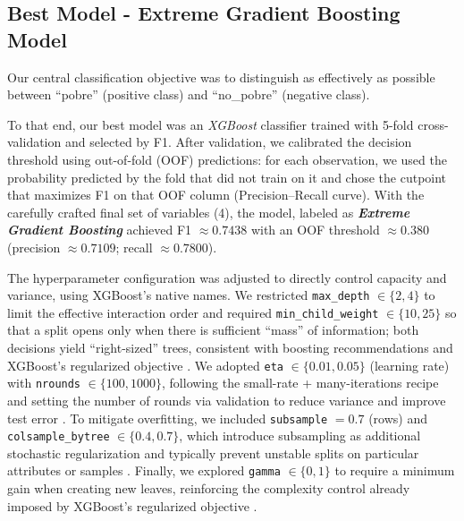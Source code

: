 \documentclass[12pt,a4paper,onecolumn]{article}
\begin{document}
\subsection{Best Model - Extreme Gradient Boosting Model}

Our central classification objective was to distinguish as effectively as possible between ``pobre'' (positive class) and ``no\_pobre'' (negative class).

To that end, our best model was an \textit{XGBoost} classifier trained with 5-fold cross-validation and selected by F1. After validation, we calibrated the decision threshold using out-of-fold (OOF) predictions: for each observation, we used the probability predicted by the fold that did not train on it and chose the cutpoint that maximizes F1 on that OOF column (Precision--Recall curve). With the carefully crafted
final set of variables (4), the model, labeled as \textbf{\textit{Extreme Gradient Boosting}} achieved F1 $\approx 0.7438$ with an OOF threshold $\approx 0.380$ (precision $\approx 0.7109$; recall $\approx 0.7800$). 

The hyperparameter configuration was adjusted to directly control capacity and variance, using XGBoost’s native names. We restricted \texttt{max\_depth} $\in \{2,4\}$ to limit the effective interaction order and required \texttt{min\_child\_weight} $\in \{10,25\}$ so that a split opens only when there is sufficient ``mass'' of information; both decisions yield ``right-sized'' trees, consistent with boosting recommendations and XGBoost’s regularized objective \citep{ChenGuestrin2016,HastieTibshiraniFriedman2009}. We adopted \texttt{eta} $\in \{0.01,0.05\}$ (learning rate) with \texttt{nrounds} $\in \{100,1000\}$, following the small-rate + many-iterations recipe and setting the number of rounds via validation to reduce variance and improve test error \citep{Friedman2001,HastieTibshiraniFriedman2009}. To mitigate overfitting, we included \texttt{subsample} $= 0.7$ (rows) and \texttt{colsample\_bytree} $\in \{0.4,0.7\}$, which introduce subsampling as additional stochastic regularization and typically prevent unstable splits on particular attributes or samples \citep{ChenGuestrin2016,HastieTibshiraniFriedman2009}. Finally, we explored \texttt{gamma} $\in \{0,1\}$ to require a minimum gain when creating new leaves, reinforcing the complexity control already imposed by XGBoost’s regularized objective \citep{ChenGuestrin2016}.
\end{document}
